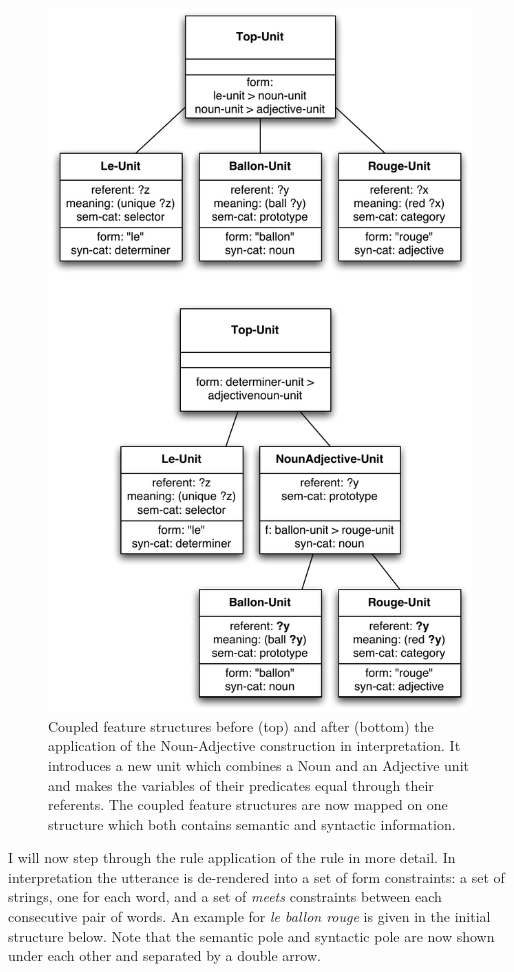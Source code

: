 \begin{figure}
  \begin{center}
    \includegraphics[width=.7\textwidth]{./frameworks/figures/nounadj-application.pdf}
    \caption[Coupled feature structures before and after the
    application of an example construction]{Coupled feature structures
      before (top) and after (bottom) the application of the
      Noun-Adjective construction in interpretation. It introduces a
      new unit which combines a Noun and an Adjective unit and makes
      the variables of their predicates equal through their
      referents. The coupled feature structures are now mapped on one
      structure which both contains semantic and syntactic
      information.}
    \label{f:nounadj-application}
  \end{center}
\end{figure}

I will now step through the rule application of the rule in more
detail. In interpretation the utterance is de-rendered into a set of
form constraints: a set of strings, one for each word, and a set of
\emph{meets} constraints between each consecutive pair of words. An example
for \textit{le ballon rouge} is given in the initial structure below. Note
that the semantic pole and syntactic pole are now shown under each
other and separated by a double arrow.

